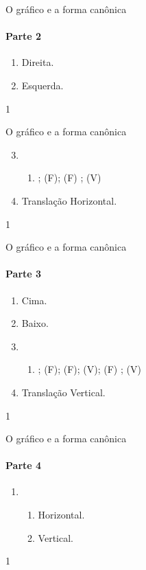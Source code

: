 \begin{answer}{O gráfico e a forma canônica}
{
\paragraph{Parte 2}

\begin{enumerate}
\item {} 
Direita.

\item {} 
Esquerda.
\end{enumerate}
}{1}
\end{answer}
\clearmargin
\begin{answer}{O gráfico e a forma canônica}
{
\begin{enumerate}\setcounter{enumi}{2}
\item {} 
\begin{enumerate}
\item {} 
; (F); (F) ; (V)
\end{enumerate}
\item {} 
Translação Horizontal.
\end{enumerate}
}{1}
\end{answer}
\clearmargin
\begin{answer}{O gráfico e a forma canônica}
{
\paragraph{Parte 3}
\begin{enumerate}
\item {} 
Cima.

\item {} 
Baixo.

\item {} 

\begin{enumerate}
\item {} 
; (F); (F); (V); (F) ; (V)
\end{enumerate}
\item {} 
Translação Vertical.
\end{enumerate}
}{1}
\end{answer}
\clearmargin
\clearmargin
\begin{answer}{O gráfico e a forma canônica}
{
\paragraph{Parte 4}
\begin{enumerate}
\item 
\begin{enumerate}[label=\titem{\roman*)}]
\item Horizontal.
\item Vertical.
\end{enumerate}
\end{enumerate}
}{1}
\end{answer}
